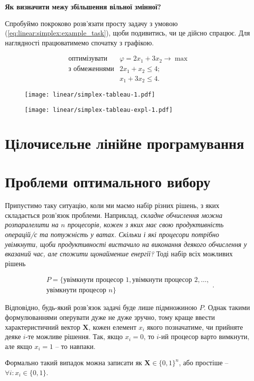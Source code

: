 \documentclass[\main/book.tex]{subfiles}
\begin{document}
\textbf{Як визначити межу збільшення вільної змінної?} \quad

Спробуймо покроково розв'язати просту задачу з умовою (\ref{eq:linear:simplex:example_task}), щоби подивитись, чи це дійсно спрацює. Для наглядності працюватимемо спочатку з графікою.

\begin{equation}
 \begin{array}{rl}
  \text{оптимізувати}  & \varphi = 2 x_1 + 3 x_2 \rightarrow \max \\
  \text{з обмеженнями} & 2 x_1 +   x_2 \leq 4; \\
                       &   x_1 + 3 x_2 \leq 4.
 \end{array}
 \label{eq:linear:simplex:example_task}
\end{equation}

\begin{figure}
 \centering
 \texttt{[image: linear/simplex-tableau-1.pdf]}
\end{figure}

\begin{figure}
 \centering
 \texttt{[image: linear/simplex-tableau-expl-1.pdf]}
\end{figure}
\section{Цілочисельне лінійне програмування}
\label{section:linear:integer}

\section{Проблеми оптимального вибору}
\label{section:linear:x_in_0-1}

Припустимо таку ситуацію, коли ми маємо набір різних рішень, з яких складається розв'язок проблеми. Наприклад, \textit{складне обчислення можна розпаралелити на $n$ процесорів, кожен з яких має свою продуктивність операцій/с та потужність у ватах. Скільки і які процесори потрібно увімкнути, щоби продуктивності вистачило на виконання деякого обчислення у вказаний час, але спожити щонайменше енергії?} Тоді набір всіх можливих рішень

\[
\begin{split}
P = \{
 \text{увімкнути процесор 1},
 \text{увімкнути процесор 2},
 \ldots, \\
 \text{увімкнути процесор $n$}
\}
\end{split}
.
\]

Відповідно, будь-який розв'язок задачі буде лише підмножиною $P$. Однак такими формулюваннями оперувати дуже не дуже зручно, тому краще ввести характеристичний вектор $\mathbf{X}$, кожен елемент $x_i$ якого позначатиме, чи прийняте деяке $i$-те можливе рішення. Так, якщо $x_i=0$, то $i$-ий процесор варто вимкнути, але якщо $x_i=1$ -- то навпаки.

\begin{note}
 Формально такий випадок можна записати як $\mathbf{X} \in \{0, 1\}^{n}$, або простіше -- $\forall i: x_i \in \{0, 1\}$.
\end{note}
\end{document}
